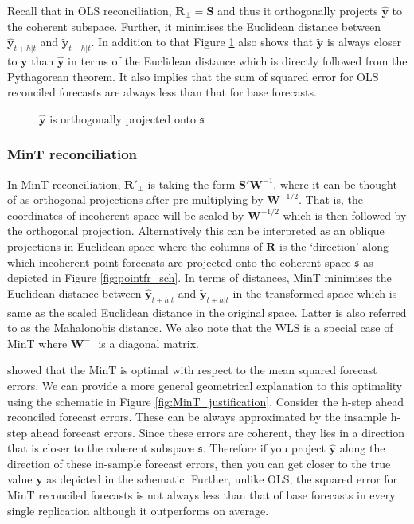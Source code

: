 \documentclass[12pt]{article}
\theoremstyle{definition}
\begin{document}
	Recall that in OLS reconciliation, $\bm{R}_\perp=\bm{S}$ and thus it orthogonally projects $\hat{\bm{y}}$ to the coherent subspace. Further, it minimises the Euclidean distance between $\hat{\bm{y}}_{t+h|t}$ and $\tilde{\bm{y}}_{t+h|t}$. In addition to that Figure \ref{fig:Schematic_OLSRecon} also shows that $\tilde{\bm{y}}$ is always closer to $\bm{y}$ than $\hat{\bm{y}}$ in terms of the Euclidean distance which is directly followed from the Pythagorean theorem. It also implies that the sum of squared error for OLS reconciled forecasts are always less than that for base forecasts.    
	
	\clearpage		
	\begin{figure}[!ht]
		\centering
		\vspace{-0.9cm}
		\tiny
		\resizebox{\linewidth}{!}{
			
		}
		\caption{$\hat{\bm{y}}$ is orthogonally projected onto $\mathfrak{s}$ }\label{fig:Schematic_OLSRecon}
	\end{figure}
	
	\subsubsection{MinT reconciliation}
	
	In MinT reconciliation, $\bm{R}'_\perp$ is taking the form $\bm{S}'{\bm{W}}^{-1}$, where it can be thought of as orthogonal projections after pre-multiplying by ${\bm{W}^{-1/2}}$. That is, the coordinates of incoherent space will be scaled by $\bm{W}^{-1/2}$ which is then followed by the orthogonal projection. Alternatively this can be interpreted as an oblique projections in Euclidean space where the columns of $\bm{R}$ is the `direction' along which incoherent point forecasts are projected onto the coherent space $\mathfrak{s}$ as depicted in Figure \ref{fig:pointfr_sch}. In terms of distances, MinT minimises the Euclidean distance between $\hat{\bm{y}}_{t+h|t}$ and $\tilde{\bm{y}}_{t+h|t}$ in the transformed space which is same as the scaled Euclidean distance in the original space. Latter is also referred to as the Mahalonobis distance. We also note that the WLS is a special case of MinT where $\bm{W}^{-1}$ is a diagonal matrix. 
	
	\citet{Wickramasuriya2017} showed that the MinT is optimal with respect to the mean squared forecast errors. 
	We can provide a more general geometrical explanation to this optimality using the schematic in Figure \ref{fig:MinT_justification}. Consider the h-step ahead reconciled forecast errors. These can be always approximated by the insample h-step ahead forecast errors. Since these errors are coherent, they lies in a direction that is closer to the coherent subspace $\mathfrak{s}$. Therefore if you project $\hat{\bm{y}}$ along the direction of these in-sample forecast errors, then you can get closer to the true value $\bm{y}$ as depicted in the schematic. Further, unlike OLS, the squared error for MinT reconciled forecasts is not always less than that of base forecasts in every single replication although it outperforms on average.
\end{document}
